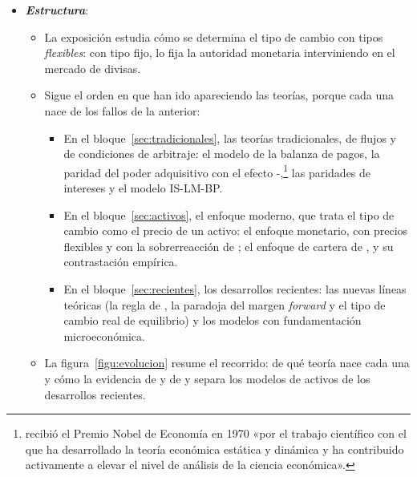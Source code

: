 \documentclass[11pt]{article}
\begin{document}
\begin{itemize}
\item \textbf{\emph{Estructura}}:
  \begin{itemize}
  \item La exposición estudia cómo se determina el tipo de cambio con tipos \emph{flexibles}: con tipo fijo, lo fija la autoridad monetaria interviniendo en el mercado de divisas.
  \item Sigue el orden en que han ido apareciendo las teorías, porque cada una nace de los fallos de la anterior:
  \begin{itemize}
  \item En el bloque~\ref{sec:tradicionales}, las teorías tradicionales, de flujos y de condiciones de arbitraje: el modelo de la balanza de pagos, la paridad del poder adquisitivo con el efecto -,\footnote{ recibió el Premio Nobel de Economía en 1970 «por el trabajo científico con el que ha desarrollado la teoría económica estática y dinámica y ha contribuido activamente a elevar el nivel de análisis de la ciencia económica»\nocite{Nobel1970Samuelson}.} las paridades de intereses y el modelo IS-LM-BP.
  \item En el bloque~\ref{sec:activos}, el enfoque moderno, que trata el tipo de cambio como el precio de un activo: el enfoque monetario, con precios flexibles y con la sobrerreacción de ; el enfoque de cartera de , y su contrastación empírica.
  \item En el bloque~\ref{sec:recientes}, los desarrollos recientes: las nuevas líneas teóricas (la regla de , la paradoja del margen \emph{forward} y el tipo de cambio real de equilibrio) y los modelos con fundamentación microeconómica.
  \end{itemize}
  \item La figura~\ref{figu:evolucion} resume el recorrido: de qué teoría nace cada una y cómo la evidencia de  y de  y  separa los modelos de activos de los desarrollos recientes.
  \end{itemize}
\end{itemize}
\end{document}
